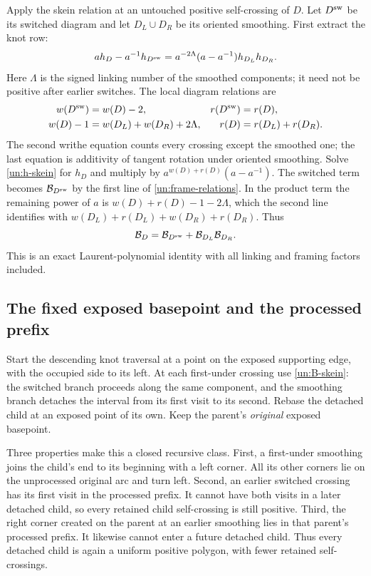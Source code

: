 \documentclass[11pt,letterpaper]{article}
\numberwithin{equation}{section}
\theoremstyle{definition}
\theoremstyle{remark}
\begin{document}
Apply the skein relation at an untouched positive self-crossing of $D$.
Let $D^{\rm sw}$ be its switched diagram and let $D_L\cup D_R$ be its
oriented smoothing.  First extract the knot row:
\begin{equation}
 a h_D-a^{-1}h_{D^{\rm sw}}
   =a^{-2\Lambda}(a-a^{-1})h_{D_L}h_{D_R}.
 \label{un:h-skein}
\end{equation}
Here $\Lambda$ is the signed linking number of the smoothed components;
it need not be positive after earlier switches.  The local diagram
relations are
\begin{equation}
\begin{aligned}
 w(D^{\rm sw})&=w(D)-2,
       &r(D^{\rm sw})&=r(D),\\
 w(D)-1&=w(D_L)+w(D_R)+2\Lambda,
       &r(D)&=r(D_L)+r(D_R).
\end{aligned}
 \label{un:frame-relations}
\end{equation}
The second writhe equation counts every crossing except the smoothed
one; the last equation is additivity of tangent rotation under oriented
smoothing.  Solve \eqref{un:h-skein} for $h_D$ and multiply by
$a^{w(D)+r(D)}(a-a^{-1})$.  The switched term becomes
$\mathcal B_{D^{\rm sw}}$ by the first line of
\eqref{un:frame-relations}.  In the product term the remaining power of
$a$ is $w(D)+r(D)-1-2\Lambda$, which the second line identifies with
$w(D_L)+r(D_L)+w(D_R)+r(D_R)$.  Thus
\begin{equation}
 \mathcal B_D
   =\mathcal B_{D^{\rm sw}}+
       \mathcal B_{D_L}\mathcal B_{D_R}.
 \label{un:B-skein}
\end{equation}
This is an exact Laurent-polynomial identity with all linking and framing
factors included.

\subsection{The fixed exposed basepoint and the processed prefix}
\label{un:prefix}

Start the descending knot traversal at a point on the exposed supporting
edge, with the occupied side to its left.  At each first-under crossing
use \eqref{un:B-skein}: the switched branch proceeds along the same
component, and the smoothing branch detaches the interval from its first
visit to its second.  Rebase the detached child at an exposed point of
its own.  Keep the parent's \emph{original} exposed basepoint.

Three properties make this a closed recursive class.  First, a
first-under smoothing joins the child's end to its beginning with a
left corner.  All its other corners lie on the unprocessed original
arc and turn left.  Second, an earlier switched crossing has its first
visit in the processed prefix.  It cannot have both visits in a later
detached child, so every retained child self-crossing is still positive.
Third, the right corner created on the parent at an earlier smoothing
lies in that parent's processed prefix.  It likewise cannot enter a
future detached child.  Thus every detached child is again a uniform
positive polygon, with fewer retained self-crossings.
\end{document}
